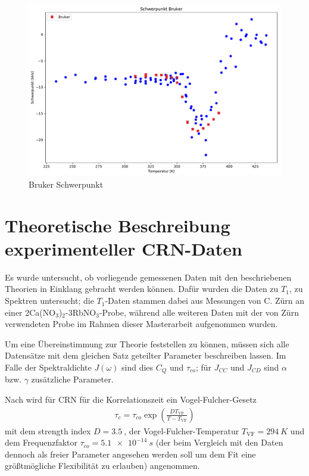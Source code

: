 \begin{figure}
	\begin{center}
		\includegraphics[width=\textwidth]{graphics/plots/BRUKER/bruker_mean.pdf} 
	\end{center}
	\caption{Bruker Schwerpunkt} \label{fig:res:bruker_mean}
\end{figure}





\section{Theoretische Beschreibung experimenteller CRN-Daten} \label{section:theo:daten}


Es wurde untersucht, ob vorliegende gemessenen Daten mit den beschriebenen Theorien in Einklang gebracht werden können. Dafür wurden die Daten zu $T_1$, zu Spektren untersucht; die $T_1$-Daten stammen dabei aus Messungen von C. Zürn \cite{zuern_paper} an einer 2Ca(NO$_3$)$_2$-3RbNO$_3$-Probe, während alle weiteren Daten mit der von Zürn verwendeten Probe im Rahmen dieser Masterarbeit aufgenommen wurden.

Um eine Übereinstimmung zur Theorie feststellen zu können, müssen sich alle Datensätze mit dem gleichen Satz geteilter Parameter beschreiben lassen. Im Falle der Spektraldichte $J(\omega)$ sind dies $C_Q$ und $\tau_{co}$; für $J_{CC}$ und $J_{CD}$ sind $\alpha$ bzw. $\gamma$ zusätzliche Parameter.

Nach \cite{PIMENOV199793} wird für CRN für die Korrelationszeit ein Vogel-Fulcher-Gesetz
\begin{align}
	\tau_c = \tau_{co} \exp \left( \frac{D T_\text{VF}}{T-T_\text{VF}} \right) 
\end{align}
mit dem strength index $D = \SI{3.5}{}$, der Vogel-Fulcher-Temperatur $T_\text{VF} = \SI{294}{K}$ und dem Frequenzfaktor $\tau_{co} = \SI{5.1e-14}{s}$ (der beim Vergleich mit den Daten dennoch als freier Parameter angesehen werden soll um dem Fit eine größtmögliche Flexibilität zu erlauben) angenommen.


